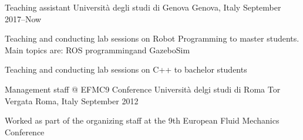 \begin{cventries}
  \cventry
    {Teaching assistant} %
    {Università degli studi di Genova} %
    {Genova, Italy} %
    {September 2017–Now} %
    {
      \begin{cvitems} %
        \item {Teaching and conducting lab sessions on Robot Programming to master students. Main topics are: ROS programmingand GazeboSim}
        \item {Teaching and conducting lab sessions on C++ to bachelor students}
      \end{cvitems}
    }
  \cventry
    {Management staff @ EFMC9 Conference} %
    {Università delgi studi di Roma Tor Vergata} %
    {Roma, Italy} %
    {September 2012} %
    {
      \begin{cvitems} %
        \item {Worked as part of the organizing staff at the 9th European Fluid Mechanics Conference}
      \end{cvitems}
    }

\end{cventries}
